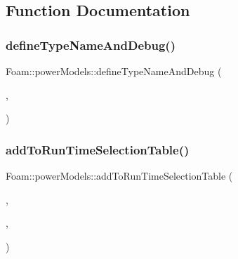 \subsection{Function Documentation}
\mbox{\label{namespaceFoam_1_1powerModels_ae9fb428c437de2a40b135fe0795a5ea8}} 
\subsubsection{\texorpdfstring{define\+Type\+Name\+And\+Debug()}{defineTypeNameAndDebug()}\hspace{0.1cm}{\footnotesize\ttfamily [1/5]}}
{\footnotesize\ttfamily Foam\+::power\+Models\+::define\+Type\+Name\+And\+Debug (\begin{DoxyParamCaption}\item[{\hyperlink{classFoam_1_1powerModels_1_1fixedPower}{fixed\+Power}}]{,  }\item[{0}]{ }\end{DoxyParamCaption})}

\mbox{\label{namespaceFoam_1_1powerModels_adf625c5c0aac99773a4d45911eb10469}} 
\subsubsection{\texorpdfstring{add\+To\+Run\+Time\+Selection\+Table()}{addToRunTimeSelectionTable()}\hspace{0.1cm}{\footnotesize\ttfamily [1/5]}}
{\footnotesize\ttfamily Foam\+::power\+Models\+::add\+To\+Run\+Time\+Selection\+Table (\begin{DoxyParamCaption}\item[{\hyperlink{classFoam_1_1powerModel}{power\+Model}}]{,  }\item[{\hyperlink{classFoam_1_1powerModels_1_1fixedPower}{fixed\+Power}}]{,  }\item[{power\+Models}]{ }\end{DoxyParamCaption})}


